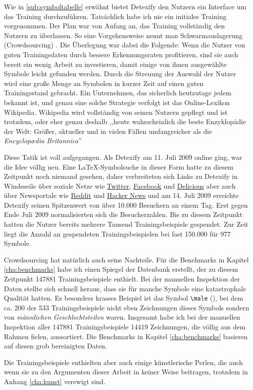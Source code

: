 Wie in \ref{sub:symboltabelle} erwähnt bietet Detexify den Nutzern ein Interface um das Training durchzuführen. Tatsächlich habe ich nie ein initiales Training vorgenommen. Der Plan war von Anfang an, das Training vollständig den Nutzern zu überlassen. So eine Vorgehensweise nennt man Schwarmauslagerung (Crowdsourcing) \cite{Howe:2006p11814}. Die Überlegung war dabei die Folgende: Wenn die Nutzer von guten Trainingsdaten durch bessere Erkennungsraten profitieren, sind sie auch bereit ein wenig Arbeit zu investieren, damit einige von ihnen ausgewählte Symbole leicht gefunden werden. Durch die Streuung der Auswahl der Nutzer wird eine große Menge an Symbolen in kurzer Zeit auf einen guten Trainingsstand gebracht. Ein Unternehmen, das sicherlich heutzutage jedem bekannt ist, und genau eine solche Strategie verfolgt ist das Online-Lexikon Wikipedia. Wikipedia wird vollständig von seinen Nutzern gepflegt und ist trotzdem, oder eher genau deshalb ,,heute wahrscheinlich die beste Enzyklopädie der Welt: Größer, aktueller und in vielen Fällen umfangreicher als die \emph{Encyclop\ae dia Britannica}'' \citep[S.77-86]{andersen2006long}

Diese Tatik ist voll aufgegangen. Als Detexify am 11. Juli 2009 online ging, war die Idee völlig neu. Eine \LaTeX-Symbolsuche in dieser Form hatte zu diesem Zeitpunkt noch niemand gesehen, daher verbreiteten sich Links zu Detexify in Windeseile über soziale Netze wie \href{http://twitter.com}{Twitter}, \href{http://facebook.com}{Facebook} und \href{http://delicious.com}{Delicious} aber auch über Newsportale wie \href{http://reddit.com}{Reddit} und \href{http://news.ycombinator.com}{Hacker News} und am 14. Juli 2009 erreichte Detexify seinen Spitzenwert von über 10.000 Besuchern an einem Tag. Erst gegen Ende Juli 2009 normalisierten sich die Besucherzahlen. Bis zu diesem Zeitpunkt hatten die Nutzer bereits mehrere Tausend Trainingsbeispiele gespendet. Zur Zeit liegt die Anzahl an gespendeten Trainingsbeispielen bei fast 150.000 für 977 Symbole.

Crowdsourcing hat natürlich auch seine Nachteile. Für die Benchmarks in Kapitel \ref{cha:benchmarks} habe ich einen Spiegel der Datenbank erstellt, der zu diesem Zeitpunkt 147881 Trainingsbeispiele enthielt. Bei der manuellen Inspektion der Daten stellte sich schnell heraus, dass sie für manche Symbole eine katastrophale Qualität hatten. Es besonders krasses Beispiel ist das Symbol \verb!\male! (\Male), %
bei dem ca. 200 der 533 Trainingsbeispiele nicht eben Zeichnungen dieses Symbols sondern von \emph{männlichen Geschlechtsteilen} waren. Insgesamt habe ich bei der manuellen Inspektion aller 147881 Trainingsbeispiele 14419 Zeichnungen, die völlig aus dem Rahmen fielen, aussortiert. Die Benchmarks in Kapitel \ref{cha:benchmarks} basieren auf diesen grob bereinigten Daten.

Die Trainingsbeispiele enthielten aber auch einige künstlerische Perlen, die auch wenn sie zu den Argumenten dieser Arbeit in keiner Weise beitragen, trotzdem in Anhang \ref{cha:kunst} verewigt sind.


